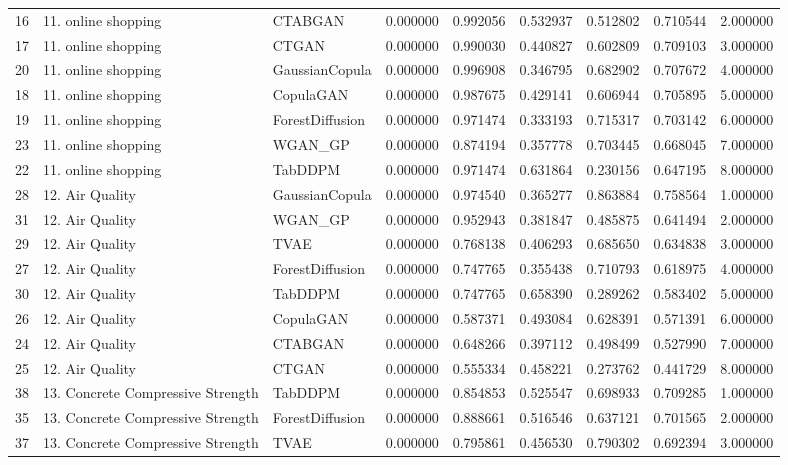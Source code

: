 \begin{tabular}{lllrrrrrr}
16 & 11. online shopping & CTABGAN & 0.000000 & 0.992056 & 0.532937 & 0.512802 & 0.710544 & 2.000000 \\
17 & 11. online shopping & CTGAN & 0.000000 & 0.990030 & 0.440827 & 0.602809 & 0.709103 & 3.000000 \\
20 & 11. online shopping & GaussianCopula & 0.000000 & 0.996908 & 0.346795 & 0.682902 & 0.707672 & 4.000000 \\
18 & 11. online shopping & CopulaGAN & 0.000000 & 0.987675 & 0.429141 & 0.606944 & 0.705895 & 5.000000 \\
19 & 11. online shopping & ForestDiffusion & 0.000000 & 0.971474 & 0.333193 & 0.715317 & 0.703142 & 6.000000 \\
23 & 11. online shopping & WGAN_GP & 0.000000 & 0.874194 & 0.357778 & 0.703445 & 0.668045 & 7.000000 \\
22 & 11. online shopping & TabDDPM & 0.000000 & 0.971474 & 0.631864 & 0.230156 & 0.647195 & 8.000000 \\
28 & 12. Air Quality & GaussianCopula & 0.000000 & 0.974540 & 0.365277 & 0.863884 & 0.758564 & 1.000000 \\
31 & 12. Air Quality & WGAN_GP & 0.000000 & 0.952943 & 0.381847 & 0.485875 & 0.641494 & 2.000000 \\
29 & 12. Air Quality & TVAE & 0.000000 & 0.768138 & 0.406293 & 0.685650 & 0.634838 & 3.000000 \\
27 & 12. Air Quality & ForestDiffusion & 0.000000 & 0.747765 & 0.355438 & 0.710793 & 0.618975 & 4.000000 \\
30 & 12. Air Quality & TabDDPM & 0.000000 & 0.747765 & 0.658390 & 0.289262 & 0.583402 & 5.000000 \\
26 & 12. Air Quality & CopulaGAN & 0.000000 & 0.587371 & 0.493084 & 0.628391 & 0.571391 & 6.000000 \\
24 & 12. Air Quality & CTABGAN & 0.000000 & 0.648266 & 0.397112 & 0.498499 & 0.527990 & 7.000000 \\
25 & 12. Air Quality & CTGAN & 0.000000 & 0.555334 & 0.458221 & 0.273762 & 0.441729 & 8.000000 \\
38 & 13. Concrete Compressive Strength & TabDDPM & 0.000000 & 0.854853 & 0.525547 & 0.698933 & 0.709285 & 1.000000 \\
35 & 13. Concrete Compressive Strength & ForestDiffusion & 0.000000 & 0.888661 & 0.516546 & 0.637121 & 0.701565 & 2.000000 \\
37 & 13. Concrete Compressive Strength & TVAE & 0.000000 & 0.795861 & 0.456530 & 0.790302 & 0.692394 & 3.000000 \\

\end{tabular}
